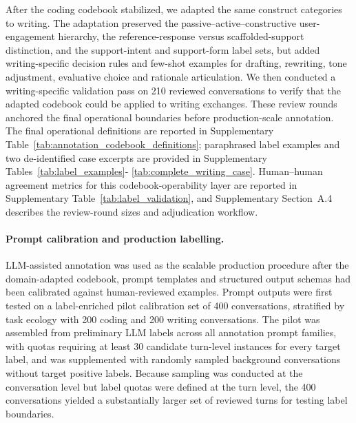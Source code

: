 After the coding codebook stabilized, we adapted the same construct categories to writing. The adaptation preserved the passive--active--constructive user-engagement hierarchy, the reference-response versus scaffolded-support distinction, and the support-intent and support-form label sets, but added writing-specific decision rules and few-shot examples for drafting, rewriting, tone adjustment, evaluative choice and rationale articulation. We then conducted a writing-specific validation pass on 210 reviewed conversations to verify that the adapted codebook could be applied to
writing exchanges. These review rounds anchored the final operational boundaries before production-scale annotation. The final operational definitions are reported in
Supplementary Table~\ref{tab:annotation_codebook_definitions}; paraphrased label examples and two de-identified case excerpts are provided in Supplementary Tables~\ref{tab:label_examples}- \ref{tab:complete_writing_case}. Human--human agreement metrics for this codebook-operability layer are reported in Supplementary Table~\ref{tab:label_validation}, and Supplementary Section~A.4 describes the review-round sizes and adjudication workflow.

\paragraph{Prompt calibration and production labelling.}
LLM-assisted annotation was used as the scalable production procedure after the domain-adapted codebook, prompt templates and structured output schemas had been calibrated against human-reviewed examples. Prompt outputs were first tested on a
label-enriched pilot calibration set of 400 conversations, stratified by task ecology with 200 coding and 200 writing conversations. The pilot was assembled from preliminary LLM labels across all annotation prompt families, with quotas requiring at least 30 candidate turn-level instances for every target label, and was supplemented with randomly sampled background conversations without target positive labels.
Because sampling was conducted at the conversation level but label quotas were defined at the turn level, the 400 conversations yielded a substantially larger set of reviewed
turns for testing label boundaries.

